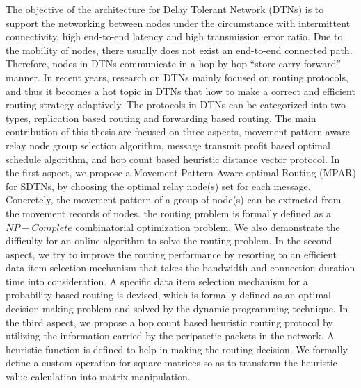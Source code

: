\begin{englishabstract}

The objective of the architecture for Delay Tolerant Network (DTNs) is to support the networking between nodes under the circumstance with intermittent connectivity, high end-to-end latency and high transmission error ratio. Due to the mobility of nodes, there usually does not exist an end-to-end connected path. Therefore, nodes in DTNs communicate in a hop by hop ``store-carry-forward'' manner. In recent years, research on DTNs mainly focused on routing protocols, and thus it becomes a hot topic in DTNs that how to make a correct and efficient routing strategy adaptively. The protocols in DTNs can be categorized into two types, replication based routing and forwarding based routing. The main contribution of this thesis are focused on three aspects, movement pattern-aware relay node group selection algorithm, message transmit profit based optimal schedule algorithm, and hop count based heuristic distance vector protocol. In the first aspect, we propose a Movement Pattern-Aware optimal Routing (MPAR) for SDTNs, by choosing the optimal relay node(s) set for each message. Concretely, the movement pattern of a group of node(s) can be extracted from the movement records of nodes. the routing problem is formally defined as a $NP-Complete$ combinatorial optimization problem.
We also demonstrate the difficulty for an online algorithm to solve the routing problem. 
In the second aspect, we try to improve the routing performance by resorting to an efficient data item selection mechanism that takes the bandwidth and connection duration time into consideration. A specific data item selection mechanism for a probability-based routing is devised, which is formally defined as an optimal decision-making problem and solved by the dynamic programming technique.
In the third aspect, we propose a hop count based heuristic routing protocol by utilizing the information carried by the peripatetic packets in the network. A heuristic function is defined to help in making the routing decision. We formally define a custom operation for square matrices so as to transform the heuristic value calculation into matrix manipulation. 

\begin{figure}[!b]
\end{figure}
\end{englishabstract}
